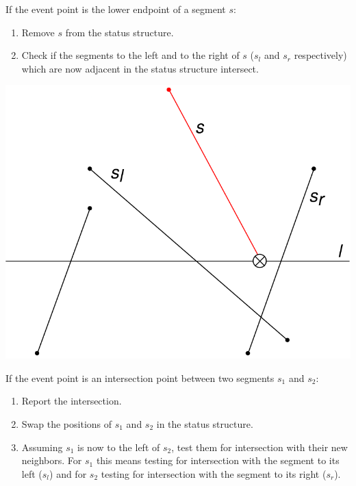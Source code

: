 \begin{enumerate}
\begin{enumerate}
\begin{minipage}{0.6\textwidth}
                        \item If the event point is the lower endpoint of a segment $s$:
                        \begin{enumerate}
                            \item Remove $s$ from the status structure.
                            \item Check if the segments to the left and to the right of $s$ ($s_l$ and $s_r$ respectively) which are now adjacent in the status structure intersect.
                        \end{enumerate}
                    \end{minipage}
                    \begin{minipage}{0.3\textwidth}
                        \centering
                        \includegraphics[width=\textwidth]{images/lower.png}
                    \end{minipage}
                    \break
                    \begin{minipage}{0.6\textwidth}
                        \item If the event point is an intersection point between two segments $s_1$ and $s_2$:
                        \begin{enumerate}
                            \item Report the intersection.
                            \item Swap the positions of $s_1$ and $s_2$ in the status structure.
                            \item Assuming $s_1$ is now to the left of $s_2$, test them for intersection with their new neighbors. For $s_1$ this means testing for intersection with the segment to its left ($s_l$) and for $s_2$ testing for intersection with the segment to its right ($s_r$).

\end{enumerate}
\end{minipage}
\end{enumerate}
\end{enumerate}
